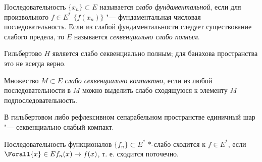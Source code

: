 \documentclass[main]{subfiles}
\begin{document}
\begin{definition}
  Последовательность $\{ x_n \} \subset E$ называется \emph{слабо фундаментальной},
  если для произвольного $f \in E^*$ $\{ f(x_n) \}$ "--- фундаментальная
  числовая последовательность. Если из слабой фундаментальности
  следует существование слабого предела, то $E$ называется
  \emph{секвенциально слабо полным}.
\end{definition}

\begin{exercise}
  Гильбертово $H$ является слабо секвенциально полным; для банахова пространства
  это не всегда верно.
\end{exercise}

\begin{definition}
  Множество $M \subset E$ \emph{слабо секвенциально компактно},
  если из любой последовательности в $M$
  можно выделить
  слабо сходящуюся к элементу $M$
  подпоследовательность.
\end{definition}

\begin{theorem*}
  В гильбертовом либо рефлексивном сепарабельном пространстве
  единичный шар "--- секвенциально слабый компакт.
\end{theorem*}

\begin{definition}
  Последовательность функционалов \( \{ f_n \} \subset E^* \)
  \( * \)-слабо сходится к \( f \in E^* \), если
  \( \Forall{x} \in E f_n(x) \to f(x) \),
  т. е. сходится поточечно.
\end{definition}
\end{document}
